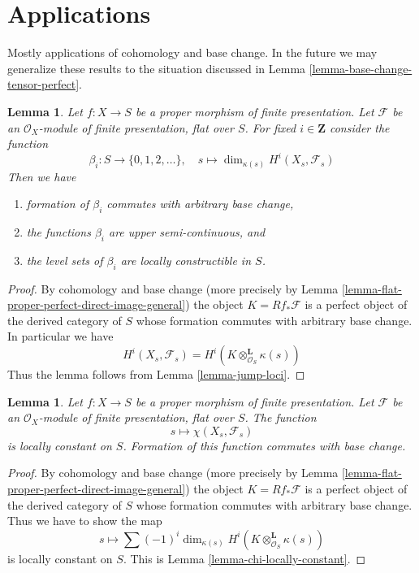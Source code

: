 \documentclass{stacks-project}
\theoremstyle{plain}
\newtheorem{lemma}[subsection]{Lemma}
\theoremstyle{definition}
\theoremstyle{remark}
\numberwithin{equation}{subsection}
\begin{document}
\section{Applications}
\label{section-applications}

\noindent
Mostly applications of cohomology and base change. In the future we may
generalize these results to the situation discussed in
Lemma \ref{lemma-base-change-tensor-perfect}.

\begin{lemma}
\label{lemma-jump-loci-geometric}
Let $f : X \to S$ be a proper morphism of finite presentation.
Let $\mathcal{F}$ be an $\mathcal{O}_X$-module of finite presentation,
flat over $S$. For fixed $i \in \mathbf{Z}$ consider the function
$$
\beta_i : S \to \{0, 1, 2, \ldots\},\quad
s \longmapsto \dim_{\kappa(s)} H^i(X_s, \mathcal{F}_s)
$$
Then we have
\begin{enumerate}
\item formation of $\beta_i$ commutes with arbitrary base change,
\item the functions $\beta_i$ are upper semi-continuous, and
\item the level sets of $\beta_i$ are locally constructible in $S$.
\end{enumerate}
\end{lemma}

\begin{proof}
By cohomology and base change (more precisely by
Lemma \ref{lemma-flat-proper-perfect-direct-image-general})
the object $K = Rf_*\mathcal{F}$ is a perfect object of the derived
category of $S$ whose formation commutes with arbitrary base change.
In particular we have
$$
H^i(X_s, \mathcal{F}_s) = H^i(K \otimes_{\mathcal{O}_S}^\mathbf{L} \kappa(s))
$$
Thus the lemma follows from
Lemma \ref{lemma-jump-loci}.
\end{proof}

\begin{lemma}
\label{lemma-chi-locally-constant-geometric}
Let $f : X \to S$ be a proper morphism of finite presentation.
Let $\mathcal{F}$ be an $\mathcal{O}_X$-module of finite presentation,
flat over $S$. The function
$$
s \longmapsto \chi(X_s, \mathcal{F}_s)
$$
is locally constant on $S$. Formation of this function commutes with
base change.
\end{lemma}

\begin{proof}
By cohomology and base change (more precisely by
Lemma \ref{lemma-flat-proper-perfect-direct-image-general})
the object $K = Rf_*\mathcal{F}$ is a perfect object of the derived
category of $S$ whose formation commutes with arbitrary base change.
Thus we have to show the map
$$
s \longmapsto \sum (-1)^i \dim_{\kappa(s)}
H^i(K \otimes^\mathbf{L}_{\mathcal{O}_S} \kappa(s))
$$
is locally constant on $S$. This is Lemma \ref{lemma-chi-locally-constant}.
\end{proof}
\end{document}
